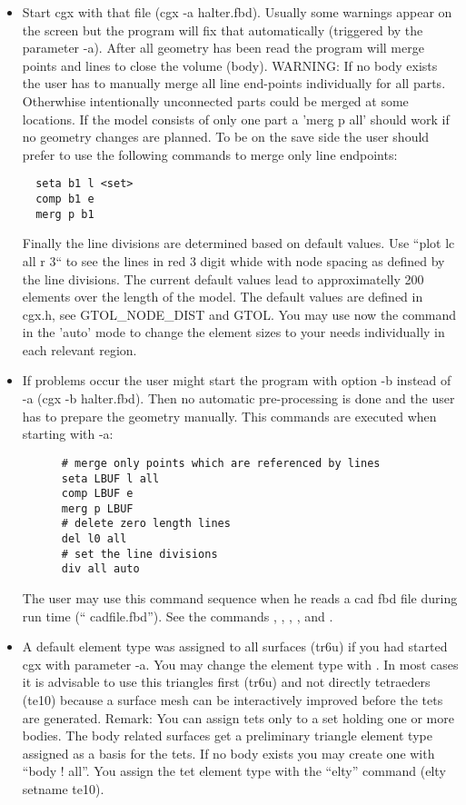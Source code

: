 \documentclass{article}
\begin{document}
\begin{appendix}
\begin{itemize}
\item Start cgx with that file (cgx -a halter.fbd). Usually some warnings appear on the screen but the program will fix that automatically (triggered by the parameter -a). After all geometry has been read the program will merge points and lines to close the volume (body). WARNING: If no body exists the user has to manually merge all line end-points individually for all parts. Otherwhise intentionally unconnected parts could be merged at some locations. If the model consists of only one part a 'merg p all' should work if no geometry changes are planned. To be on the save side the user should prefer to use the following commands to merge only line endpoints:
\begin{verbatim}
  seta b1 l <set>
  comp b1 e
  merg p b1
\end{verbatim}
Finally the line divisions are determined based on default values. Use ``plot lc all r 3`` to see the lines in red 3 digit whide with node spacing as defined by the line divisions. The current default values lead to approximatelly 200 elements over the length of the model. The default values are defined in cgx.h, see GTOL\_NODE\_DIST and GTOL. You may use now the command  in the 'auto' mode to change the element sizes to your needs individually in each relevant region.

\item If problems occur the user might start the program with option -b instead of -a (cgx -b halter.fbd). Then no automatic pre-processing is done and the user has to prepare the geometry manually. This commands are executed when starting with -a:
\begin{verbatim}
      # merge only points which are referenced by lines
      seta LBUF l all
      comp LBUF e
      merg p LBUF
      # delete zero length lines
      del l0 all
      # set the line divisions
      div all auto
\end{verbatim}
The user may use this command sequence when he reads a cad fbd file during run time (`` cadfile.fbd''). See the commands , , , ,  and .

\item A default element type was assigned to all surfaces (tr6u) if you had started cgx with parameter -a. You may change the element type with . In most cases it is advisable to use this triangles first (tr6u) and not directly tetraeders (te10) because a surface mesh can be interactively improved before the tets are generated. Remark: You can assign tets only to a set holding one or more bodies. The body related surfaces get a preliminary triangle element type assigned as a basis for the tets. If no body exists you may create one with ``body ! all''. You assign the tet element type with the ``elty'' command (elty setname te10).


\end{itemize}
\end{appendix}
\end{document}
